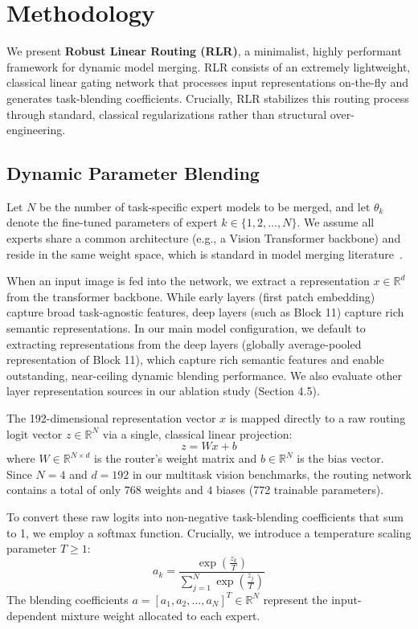 \section{Methodology}
\label{sec:method}

We present \textbf{Robust Linear Routing (RLR)}, a minimalist, highly performant framework for dynamic model merging. RLR consists of an extremely lightweight, classical linear gating network that processes input representations on-the-fly and generates task-blending coefficients. Crucially, RLR stabilizes this routing process through standard, classical regularizations rather than structural over-engineering.

\subsection{Dynamic Parameter Blending}

Let $N$ be the number of task-specific expert models to be merged, and let $\theta_k$ denote the fine-tuned parameters of expert $k \in \{1, 2, \dots, N\}$. We assume all experts share a common architecture (e.g., a Vision Transformer backbone) and reside in the same weight space, which is standard in model merging literature~\cite{Wortsman2022, Yadav2023}. 

When an input image is fed into the network, we extract a representation $x \in \mathbb{R}^d$ from the transformer backbone. While early layers (first patch embedding) capture broad task-agnostic features, deep layers (such as Block 11) capture rich semantic representations. In our main model configuration, we default to extracting representations from the deep layers (globally average-pooled representation of Block 11), which capture rich semantic features and enable outstanding, near-ceiling dynamic blending performance. We also evaluate other layer representation sources in our ablation study (Section 4.5).

The 192-dimensional representation vector $x$ is mapped directly to a raw routing logit vector $z \in \mathbb{R}^N$ via a single, classical linear projection:
\begin{equation}
z = W x + b
\end{equation}
where $W \in \mathbb{R}^{N \times d}$ is the router's weight matrix and $b \in \mathbb{R}^N$ is the bias vector. Since $N=4$ and $d=192$ in our multitask vision benchmarks, the routing network contains a total of only $768$ weights and $4$ biases (772 trainable parameters).

To convert these raw logits into non-negative task-blending coefficients that sum to 1, we employ a softmax function. Crucially, we introduce a temperature scaling parameter $T \ge 1$:
\begin{equation}
\label{eq:softmax}
a_k = \frac{\exp\left(\frac{z_k}{T}\right)}{\sum_{j=1}^N \exp\left(\frac{z_j}{T}\right)}
\end{equation}
The blending coefficients $a = [a_1, a_2, \dots, a_N]^T \in \mathbb{R}^N$ represent the input-dependent mixture weight allocated to each expert.

